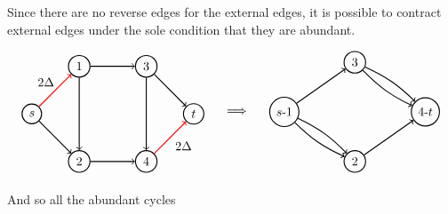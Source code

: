 Since there are no reverse edges for the external edges, it is possible to contract external edges under the sole condition that they are abundant.

\[\begin{tabular}{ccc}
    \begin{tikzpicture}[node distance={19mm}, thick , main/.style = {draw, circle}] 
    
    \node[main] (0) {$s$};
    \node[main] (1) [above right of = 0] {1};
    \node[main] (2) [below right of = 0] {2};
    \node[main] (3) [right of = 1] {3};
    \node[main] (4) [right of = 2] {4};
    \node[main] (5) [below right of = 3] {$t$};
    
    \draw[->] (0) [red] to (1);
    \draw[->] (1) to (3);
    \draw[->] (0) to (2);
    \draw[->] (2) to (4);
    \draw[->] (3) to (5);
    \draw[->] (4) [red] to (5);
    \draw[->] (1) to (2);
    \draw[->] (3) to (4);

    \node at (0.4,0.9) {$2\Delta$};
    \node at (4.3,-0.9) {$2\Delta$};

\end{tikzpicture}&\begin{tikzpicture}
    \node {$\implies$};%
    \node at (0,1.4) {};
    \node at (0,-1.6) {};
\end{tikzpicture}  &
\begin{tikzpicture}[node distance={19mm}, thick , main/.style = {draw, circle}] 
    \node[main] (0) {$s$-$1$};
    \node[main] (3) at (2,1.4) {$3$};
    \node[main] (2) at (2,-1.4) {$2$};
    \node[main] (4) at (4,0) {4-$t$};

    \draw[->] (0) to (3);
    \draw[->] (0) [bend left = 10] to (2);
    \draw[->] (0) [bend right = 10] to (2);
    
    
    \draw[->] (2) to (4);
    \draw[->] (3) [bend left = 10] to (4);
    \draw[->] (3) [bend right = 10] to (4);
    

\end{tikzpicture}
\end{tabular}\]

And so all the abundant cycles

